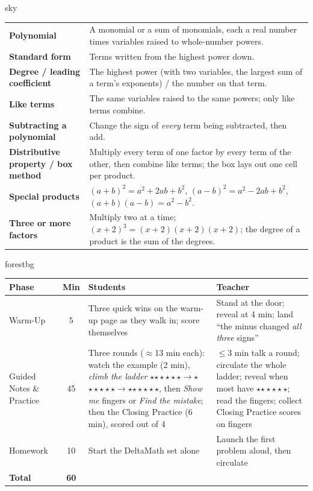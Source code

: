 \documentclass[10pt]{article}
\newcommand{\MeetingLength}{60 minutes}
\newcommand{\rung}[1]{{\color{goldacc}\ifcase#1\or$\star$\or$\star\star$\or$\star\star\star$\fi}}
\begin{document}
\begin{skillbox}{sky}
\renewcommand{\arraystretch}{1.3}
\begin{tabularx}{\linewidth}{@{}l X@{}}
\textbf{Polynomial} & A monomial or a sum of monomials, each a real number times variables raised to whole-number powers. \\
\textbf{Standard form} & Terms written from the highest power down. \\
\textbf{Degree / leading coefficient} & The highest power (with two variables, the largest sum of a term's exponents) / the number on that term. \\
\textbf{Like terms} & The same variables raised to the same powers; only like terms combine. \\
\textbf{Subtracting a polynomial} & Change the sign of \emph{every} term being subtracted, then add. \\
\textbf{Distributive property / box method} & Multiply every term of one factor by every term of the other, then combine like terms; the box lays out one cell per product. \\
\textbf{Special products} & $(a+b)^2=a^2+2ab+b^2$, \; $(a-b)^2=a^2-2ab+b^2$, \; $(a+b)(a-b)=a^2-b^2$. \\
\textbf{Three or more factors} & Multiply two at a time; $(x+2)^3=(x+2)(x+2)(x+2)$; the degree of a product is the sum of the degrees. \\
\end{tabularx}
\end{skillbox}

\begin{fixedskillbox}[Lesson at a Glance --- \MeetingLength]{forestbg}
\renewcommand{\arraystretch}{1.25}
\begin{tabularx}{\linewidth}{@{}l c X X@{}}
\textbf{Phase} & \textbf{Min} & \textbf{Students} & \textbf{Teacher} \\
\hline
Warm-Up & 5 & Three quick wins on the warm-up page as they walk in; score themselves & Stand at the door; reveal at 4 min; land ``the minus changed \emph{all three} signs'' \\
Guided Notes \& Practice & 45 & Three rounds ($\approx$13 min each): watch the example (2 min), \emph{climb the ladder} \rung1$\to$\rung2$\to$\rung3, then \emph{Show me} fingers or \emph{Find the mistake}; then the Closing Practice (6 min), scored out of 4 & $\le$3 min talk a round; circulate the whole ladder; reveal when most have \rung2; read the fingers; collect Closing Practice scores on fingers \\
Homework & 10 & Start the DeltaMath set alone & Launch the first problem aloud, then circulate \\
\hline
\textbf{Total} & \textbf{60} & & \\
\end{tabularx}
\end{fixedskillbox}
\end{document}
